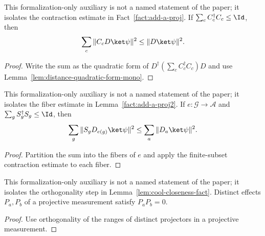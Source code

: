 \begin{lemma}
	\label{lem:distance-sum-contraction}
	\leanok
	This formalization-only auxiliary is not a named statement of the paper; it
	isolates the contraction estimate in Fact~\ref{fact:add-a-proj}. If
	$\sum_c C_c^\dagger C_c\leq\Id$, then
	\[
		\sum_c\|C_cD\ket\psi\|^2\leq\|D\ket\psi\|^2.
	\]
\end{lemma}
\begin{proof}
	\leanok
	Write the sum as the quadratic form of
	$D^\dagger(\sum_c C_c^\dagger C_c)D$ and use
	Lemma~\ref{lem:distance-quadratic-form-mono}.
\end{proof}

\begin{lemma}
	\label{lem:distance-function-indexed-contraction}
	\leanok
	This formalization-only auxiliary is not a named statement of the paper; it
	isolates the fiber estimate in Lemma~\ref{fact:add-a-proj2}. If
	$e\colon\mathcal G\to\mathcal A$ and
	$\sum_g S_g^\dagger S_g\leq\Id$, then
	\[
		\sum_g\|S_gD_{e(g)}\ket\psi\|^2
		\leq\sum_a\|D_a\ket\psi\|^2.
	\]
\end{lemma}
\begin{proof}
	\leanok
	Partition the sum into the fibers of $e$ and apply the finite-subset
	contraction estimate to each fiber.
\end{proof}

\begin{lemma}
	\label{lem:distance-projective-orthogonality}
	\leanok
	This formalization-only auxiliary is not a named statement of the paper; it
	isolates the orthogonality step in Lemma~\ref{lem:cool-closeness-fact}.
	Distinct effects $P_a,P_b$ of a projective measurement satisfy $P_aP_b=0$.
\end{lemma}
\begin{proof}
	\leanok
	Use orthogonality of the ranges of distinct projectors in a projective
	measurement.
\end{proof}


